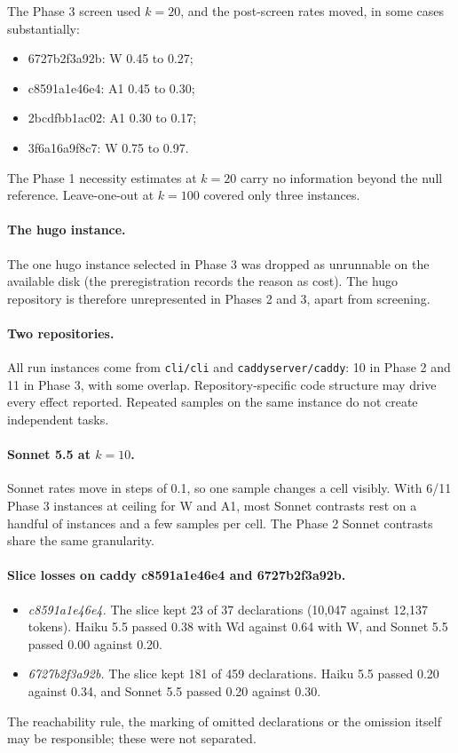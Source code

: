 The Phase 3 screen used $k=20$, and the post-screen rates moved, in some cases substantially:
\begin{itemize}
\item 6727b2f3a92b: W 0.45 to 0.27;
\item c8591a1e46e4: A1 0.45 to 0.30;
\item 2bcdfbb1ac02: A1 0.30 to 0.17;
\item 3f6a16a9f8c7: W 0.75 to 0.97.
\end{itemize}

The Phase 1 necessity estimates at $k=20$ carry no information beyond the null reference. Leave-one-out at $k=100$ covered only three instances.

\paragraph{The hugo instance.} The one hugo instance selected in Phase 3 was dropped as unrunnable on the available disk (the preregistration records the reason as cost). The hugo repository is therefore unrepresented in Phases 2 and 3, apart from screening.

\paragraph{Two repositories.} All run instances come from \texttt{cli/cli} and \texttt{caddyserver/caddy}: 10 in Phase 2 and 11 in Phase 3, with some overlap. Repository-specific code structure may drive every effect reported. Repeated samples on the same instance do not create independent tasks.

\paragraph{Sonnet 5.5 at $k=10$.} Sonnet rates move in steps of 0.1, so one sample changes a cell visibly. With 6/11 Phase 3 instances at ceiling for W and A1, most Sonnet contrasts rest on a handful of instances and a few samples per cell. The Phase 2 Sonnet contrasts share the same granularity.

\paragraph{Slice losses on caddy c8591a1e46e4 and 6727b2f3a92b.}
\begin{itemize}
\item \emph{c8591a1e46e4.} The slice kept 23 of 37 declarations (10,047 against 12,137 tokens). Haiku 5.5 passed 0.38 with Wd against 0.64 with W, and Sonnet 5.5 passed 0.00 against 0.20.
\item \emph{6727b2f3a92b.} The slice kept 181 of 459 declarations. Haiku 5.5 passed 0.20 against 0.34, and Sonnet 5.5 passed 0.20 against 0.30.
\end{itemize}
The reachability rule, the marking of omitted declarations or the omission itself may be responsible; these were not separated.

